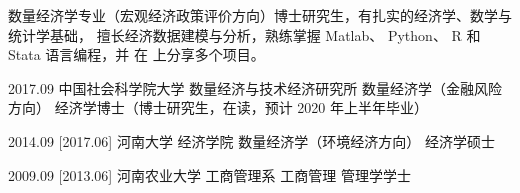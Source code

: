 \documentclass[zh]{resume}
\begin{document}
\makeheader

{\onehalfspacing\hspace{2em}%
数量经济学专业（宏观经济政策评价方向）博士研究生，有扎实的经济学、数学与统计学基础，
擅长经济数据建模与分析，熟练掌握  Matlab、 Python、 R 和 Stata 语言编程，并
在  上分享多个项目。
\par}  %

\begin{competences}
\end{competences}

\begin{educations}
  \education%
    {2017.09}%
    {中国社会科学院大学}%
    {数量经济与技术经济研究所}%
    {数量经济学（金融风险方向）}%
    {经济学博士（博士研究生，在读，预计 2020 年上半年毕业）}

  \separator{0.5em}
  \education%
    {2014.09}%
    [2017.06]%
    {河南大学}%
    {经济学院}%
    {数量经济学（环境经济方向）}%
    {经济学硕士}

  \separator{0.5em}
  \education%
    {2009.09}%
    [2013.06]%
    {河南农业大学}%
    {工商管理系}%
    {工商管理}%
    {管理学学士}
\end{educations}
\end{document}
